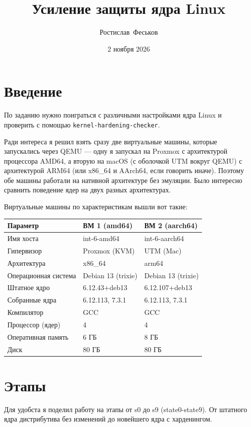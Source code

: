 \documentclass[11pt,a4paper]{article}
\title{Усиление защиты ядра Linux}
\author{Ростислав~Феськов}
\date{2 ноября 2026}
\newcommand{\cmd}[1]{\texttt{#1}}
\begin{document}
\maketitle

\section{Введение}
По заданию нужно поиграться с различными настройками ядра Linux и проверить с помощью \cmd{kernel-hardening-checker}.

Ради интереса я решил взять сразу две виртуальные машины, которые запускались через QEMU — одну я запускал на Proxmox с архитектурой процессора AMD64, а вторую на macOS (с оболочкой UTM вокруг QEMU) с архитектурой ARM64 (или x86\_64 и AArch64, если говорить иначе). Поэтому обе машины работали на нативной архитектуре без эмуляции. Было интересно сравнить поведение ядер на двух разных архитектурах.


Виртуальные машины по характеристикам вышли вот такие:

\begin{tabular}{@{}lll@{}}
\toprule
Параметр & ВМ 1 (amd64) & ВМ 2 (aarch64)\\
\midrule
Имя хоста & int-6-amd64 & int-6-aarch64\\
Гипервизор & Proxmox (KVM) & UTM (Mac)\\
Архитектура & x86\_64 & arm64\\
Операционная система & Debian 13 (trixie) & Debian 13 (trixie)\\
Штатное ядро & 6.12.43+deb13 & 6.12.107+deb13\\
Собранные ядра & 6.12.113, 7.3.1 & 6.12.113, 7.3.1\\
Компилятор & GCC & GCC\\
Процессор (ядер) & 4 & 4\\
Оперативная память & 6 ГБ & 8 ГБ\\
Диск & 80 ГБ & 80 ГБ\\
\bottomrule
\end{tabular}

\section{Этапы}
Для удобста я поделил работу на этапы от s0 до s9 (state0-state9). От штатного ядра дистрибутива без изменений до новейшего ядра с харденингом.
\end{document}
